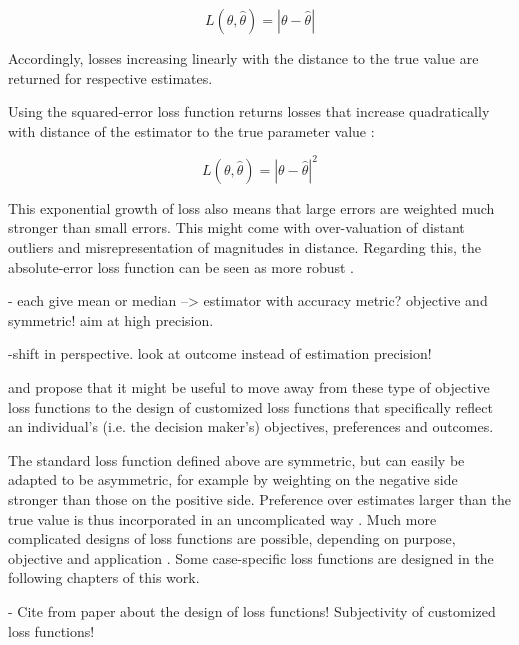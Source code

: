         \begin{equation}\label{eq:AbsLossFunction}
        L(\theta,\hat{\theta}) = |\theta - \hat{\theta}|
        \end{equation}        
        
        Accordingly, losses increasing linearly with the distance to the true value are returned for respective estimates.
        
        Using the squared-error loss function returns losses that increase quadratically with distance of the estimator to the true parameter value \citep{davidson2015}:
        
        \begin{equation}\label{eq:SqrLossFunction}
        L(\theta,\hat{\theta}) = |\theta - \hat{\theta}|^2
        \end{equation}        
        
        This exponential growth of loss also means that large errors are weighted much stronger than small errors. This might come with over-valuation of distant outliers and misrepresentation of magnitudes in distance. Regarding this, the absolute-error loss function can be seen as more robust \citep{davidson2015}.
        
        - each give mean or median --> estimator with accuracy metric? objective and symmetric! aim at high precision. 
        
        -shift in perspective. look at outcome instead of estimation precision!     
           
        \citet{davidson2015} and \citet{hennig2007} propose that it might be useful to move away from these type of objective loss functions to the design of customized loss functions that specifically reflect an individual's (i.e. the decision maker's) objectives, preferences and outcomes. 
        
        The standard loss function defined above are symmetric, but can easily be adapted to be asymmetric, for example by weighting on the negative side stronger than those on the positive side. Preference over estimates larger than the true value is thus incorporated in an uncomplicated way \citep{davidson2015}. Much more complicated designs of loss functions are possible, depending on purpose, objective and application \citep{davidson2015}. Some case-specific loss functions are designed in the following chapters of this work.
        
        - Cite from paper about the design of loss functions! Subjectivity of customized loss functions!
        
